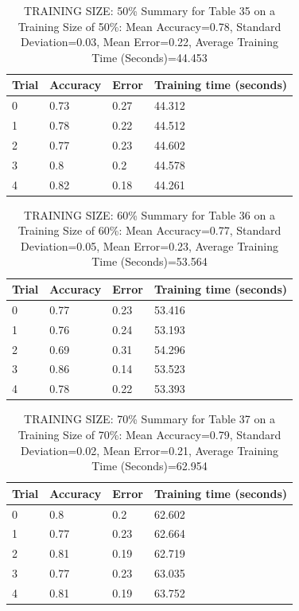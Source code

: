 \documentclass{article}
\begin{document}
\begin{table}[H]

\centering
{\begin{tabular}{||p{1cm}|p{1.8cm}|p{1.8cm}|p{3cm}||}
 \hline
Trial & Accuracy & Error & Training time (seconds) \\ [0.5ex] 
 \hline\hline
   0  & 0.73  & 0.27  & 44.312\\
\hline
   1  & 0.78  & 0.22  & 44.512\\
\hline
   2  & 0.77  & 0.23  & 44.602\\
\hline
   3  & 0.8  & 0.2  & 44.578\\
\hline
   4  & 0.82  & 0.18  & 44.261\\
\hline
\end{tabular}}
\caption{TRAINING SIZE: 50\% \newline Summary for Table 35 on a Training Size of 50\%: Mean Accuracy=0.78, Standard Deviation=0.03, Mean Error=0.22, Average Training Time (Seconds)=44.453}
\end{table} 

\begin{table}[H]

\centering
{\begin{tabular}{||p{1cm}|p{1.8cm}|p{1.8cm}|p{3cm}||}
 \hline
Trial & Accuracy & Error & Training time (seconds) \\ [0.5ex] 
 \hline\hline
   0  & 0.77  & 0.23  & 53.416\\
\hline
   1  & 0.76  & 0.24  & 53.193\\
\hline
   2  & 0.69  & 0.31  & 54.296\\
\hline
   3  & 0.86  & 0.14  & 53.523\\
\hline
   4  & 0.78  & 0.22  & 53.393\\
\hline
\end{tabular}}
\caption{TRAINING SIZE: 60\% \newline Summary for Table 36 on a Training Size of 60\%: Mean Accuracy=0.77, Standard Deviation=0.05, Mean Error=0.23, Average Training Time (Seconds)=53.564}
\end{table} 

\begin{table}[H]

\centering
{\begin{tabular}{||p{1cm}|p{1.8cm}|p{1.8cm}|p{3cm}||}
 \hline
Trial & Accuracy & Error & Training time (seconds) \\ [0.5ex] 
 \hline\hline
   0  & 0.8  & 0.2  & 62.602\\
\hline
   1  & 0.77  & 0.23  & 62.664\\
\hline
   2  & 0.81  & 0.19  & 62.719\\
\hline
   3  & 0.77  & 0.23  & 63.035\\
\hline
   4  & 0.81  & 0.19  & 63.752\\
\hline
\end{tabular}}
\caption{TRAINING SIZE: 70\% \newline Summary for Table 37 on a Training Size of 70\%: Mean Accuracy=0.79, Standard Deviation=0.02, Mean Error=0.21, Average Training Time (Seconds)=62.954}
\end{table} 
\end{document}

